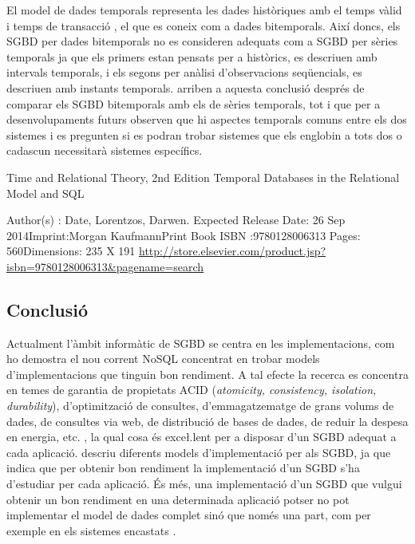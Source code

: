 El model de dades temporals representa les dades històriques amb el
temps vàlid i temps de
transacció \parencite[cap.~15]{date02:_tempor_data_relat_model}, el
que es coneix com a dades bitemporals.  Així doncs, els SGBD per dades
bitemporals no es consideren adequats com a SGBD per sèries temporals
ja que els primers estan pensats per a històrics, es descriuen amb
intervals temporals, i els segons per anàlisi d'observacions
seqüencials, es descriuen amb instants temporals.
\textcite{schmidt95} arriben a aquesta conclusió després de comparar
els SGBD bitemporals amb els de sèries temporals, tot i que per a
desenvolupaments futurs observen que hi aspectes temporals comuns
entre els dos sistemes i es pregunten si es podran trobar sistemes que
els englobin a tots dos o cadascun necessitarà sistemes específics.







Time and Relational Theory, 2nd Edition
Temporal Databases in the Relational Model and SQL
 
Author(s) : Date,     Lorentzos,    Darwen.    Expected Release Date: 26 Sep 2014Imprint:Morgan KaufmannPrint Book ISBN :9780128006313 Pages: 560Dimensions: 235 X 191
\url{http://store.elsevier.com/product.jsp?isbn=9780128006313&pagename=search}


\subsection{Conclusió}

\todo{}

Actualment l'àmbit informàtic de SGBD se centra en les
implementacions, com ho demostra el nou corrent NoSQL concentrat en
trobar models d'implementacions que tinguin bon rendiment. A tal
efecte la recerca es concentra en temes de garantia de propietats ACID
(\emph{atomicity, consistency, isolation, durability}), d'optimització
de consultes, d'emmagatzematge de grans volums de dades, de consultes
via web, de distribució de bases de dades, de reduir la despesa en
energia, etc. \parencite{stonebraker07,stonebraker10}, la qual cosa és
exce\l.lent per a disposar d'un SGBD adequat a cada aplicació.
\textcite{haerder05:_dbms_archit} descriu diferents models
d'implementació per als SGBD, ja que indica que per obtenir bon
rendiment la implementació d'un SGBD s'ha d'estudiar per cada
aplicació. És més, una implementació d'un SGBD que vulgui obtenir un
bon rendiment en una determinada aplicació potser no pot implementar
el model de dades complet sinó que només una part, com per exemple en
els sistemes
encastats \parencite{saake09:_downs_data_manag_embed_system}.

